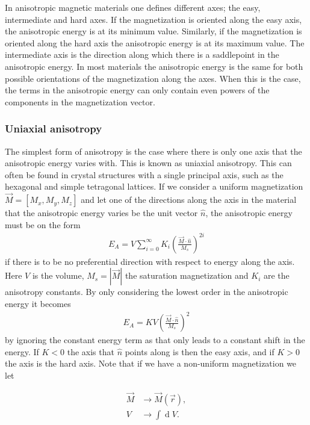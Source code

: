 \documentclass[12pt, a4paper]{article}		%
\renewcommand{\d}[1]{\ensuremath{\operatorname{d}\!{#1}}}
\numberwithin{equation}{section}
\begin{document}
In anisotropic magnetic materials one defines different axes; the easy, intermediate and hard axes. If the magnetization is oriented along the easy axis, the anisotropic energy is at its minimum value. Similarly, if the magnetization is oriented along the hard axis the anisotropic energy is at its maximum value. The intermediate axis is the direction along which there is a saddlepoint in the anisotropic energy. In most materials the anisotropic energy is the same for both possible orientations of the magnetization along the axes. When this is the case, the terms in the anisotropic energy can only contain even powers of the components in the magnetization vector.

\subsubsection{Uniaxial anisotropy}
The simplest form of anisotropy is the case where there is only one axis that the anisotropic energy varies with. This is known as uniaxial anisotropy. This can often be found in crystal structures with a single principal axis, such as the hexagonal and simple tetragonal lattices. If we consider a uniform magnetization $\vec{M} = \left[M_x, M_y, M_z\right]$ and let one of the directions along the axis in the material that the anisotropic energy varies be the unit vector $\hat{n}$, the anisotropic energy must be on the form
\begin{align}
\label{eq:uniaxialanisotropy}
E_A = V \sum_{i=0}^{\infty} K_i (\frac{\vec{M}\cdot\hat{n}}{M_s})^{2i}
\end{align}
if there is to be no preferential direction with respect to energy along the axis. Here $V$ is the volume, $M_s = |\vec{M}|$ the saturation magnetization and $K_i$ are the anisotropy constants. By only considering the lowest order in the anisotropic energy it becomes
\begin{align}
\label{eq:uniaxialanisotropy_v2}
E_A = K V (\frac{\vec{M}\cdot\hat{n}}{M_s})^2
\end{align}
by ignoring the constant energy term as that only leads to a constant shift in the energy. If $K < 0$ the axis that $\hat{n}$ points along is then the easy axis, and if $K > 0$ the axis is the hard axis. Note that if we have a non-uniform magnetization we let

\begin{align*}
\vec{M} &\rightarrow \vec{M}(\vec{r}), \\
V &\rightarrow \int \d V.
\end{align*}
\end{document}
